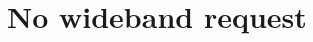 \documentclass[twocolumn]{article}
\begin{document}
\section{No wideband request}
\WBTextA\WBTextB\WBTextC\WBTextD\WBTextE\WBTextF\WBTextG\WBTextH
\end{document}
